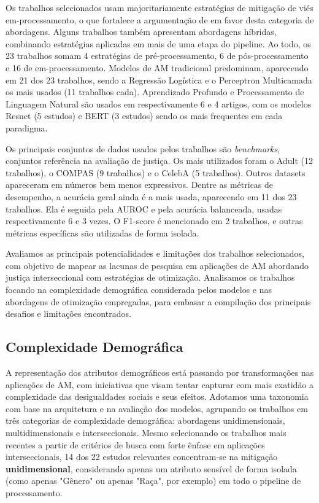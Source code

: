 Os trabalhos selecionados usam majoritariamente estratégias de mitigação de viés em-processamento, o que fortalece a argumentação de \citet{wang2020pursuit} em favor desta categoria de abordagens. Alguns trabalhos também apresentam abordagens híbridas, combinando estratégias aplicadas em mais de uma etapa do pipeline. Ao todo, os 23 trabalhos somam 4 estratégias de pré-processamento, 6 de pós-processamento e 16 de em-processamento. Modelos de AM tradicional predominam, aparecendo em 21 dos 23 trabalhos, sendo a Regressão Logística e o Perceptron Multicamada os mais usados (11 trabalhos cada). Aprendizado Profundo e Processamento de Linguagem Natural são usados em respectivamente 6 e 4 artigos, com os modelos Resnet (5 estudos) e BERT (3 estudos) sendo os mais frequentes em cada paradigma.

Os principais conjuntos de dados usados pelos trabalhos são \textit{benchmarks}, conjuntos referência na avaliação de justiça. Os mais utilizados foram o Adult (12 trabalhos), o COMPAS (9 trabalhos) e o CelebA (5 trabalhos). Outros datasets apareceram em números bem menos expressivos. Dentre as métricas de desempenho, a acurácia geral ainda é a mais usada, aparecendo em 11 dos 23 trabalhos. Ela é  seguida pela AUROC e pela acurácia balanceada, usadas respectivamente 6 e 3 vezes. O F1-score é mencionado em 2 trabalhos, e outras métricas específicas são utilizadas de forma isolada.

Avaliamos as principais potencialidades e limitações dos trabalhos selecionados, com objetivo de mapear as lacunas de pesquisa em aplicações de AM abordando justiça interseccional com estratégias de otimização. Analisamos os trabalhos focando na complexidade demográfica considerada pelos modelos e nas abordagens de otimização empregadas, para embasar a compilação dos principais desafios e limitações encontrados.

\subsection{Complexidade Demográfica}

A representação dos atributos demográficos está passando por transformações nas aplicações de AM, com iniciativas que visam tentar capturar com mais exatidão a complexidade das desigualdades sociais e seus efeitos. Adotamos uma taxonomia com base na arquitetura e na avaliação dos modelos, agrupando os trabalhos em três categorias de complexidade demográfica: abordagens unidimensionais, multidimensionais e interseccionais. Mesmo selecionando os trabalhos mais recentes a partir de critérios de busca com forte ênfase em aplicações interseccionais, 14 dos 22 estudos relevantes concentram-se na mitigação \textbf{unidimensional}, considerando apenas um atributo sensível de forma isolada (como apenas "Gênero" ou apenas "Raça", por exemplo) em todo o pipeline de processamento.


